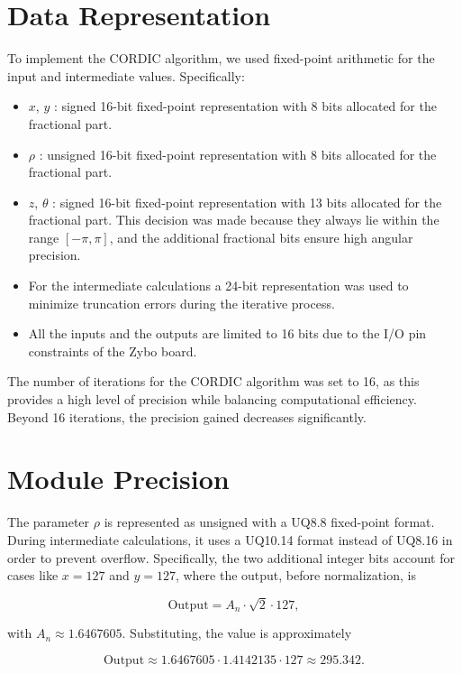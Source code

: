 \section{Data Representation}

To implement the CORDIC algorithm, we used fixed-point arithmetic for the input and intermediate values. Specifically:

\begin{itemize}
    \item \( x \), \( y \) : signed 16-bit fixed-point representation with 8 bits allocated for the fractional part.
    \item \( \rho \) : unsigned 16-bit fixed-point representation with 8 bits allocated for the fractional part.
    \item \( z \), \( \theta \) : signed 16-bit fixed-point representation with 13 bits allocated for the fractional part. This decision was made because they always lie within the range \( [-\pi, \pi] \), and the additional fractional bits ensure high angular precision.
    \item For the intermediate calculations a 24-bit representation was used to minimize truncation errors during the iterative process.
    \item All the inputs and the outputs are limited to 16 bits due to the I/O pin constraints of the Zybo board.
\end{itemize}

The number of iterations for the CORDIC algorithm was set to 16, as this provides a high level of precision while balancing computational efficiency. Beyond 16 iterations, the precision gained decreases significantly.

\section{Module Precision}
The parameter \( \rho \) is represented as unsigned with a UQ8.8 fixed-point format. During intermediate calculations, it uses a UQ10.14 format instead of UQ8.16 in order to prevent overflow. Specifically, the two additional integer bits account for cases like \( x = 127 \) and \( y = 127 \), where the output, before normalization, is

\[
\text{Output} = A_n \cdot \sqrt{2} \cdot 127,
\]

with \( A_n \approx 1.6467605 \). Substituting, the value is approximately 

\[
\text{Output} \approx 1.6467605 \cdot 1.4142135 \cdot 127 \approx 295.342.
\]

